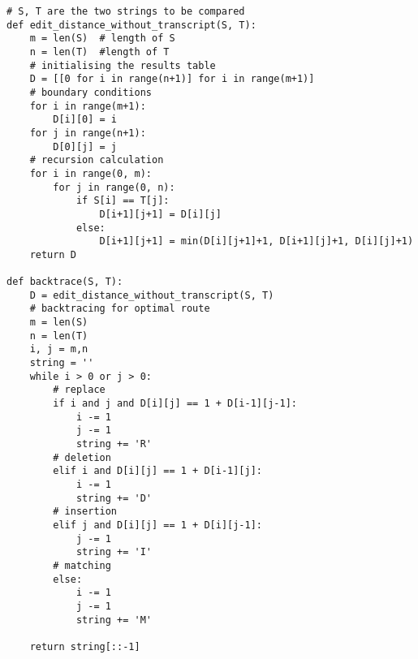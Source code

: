 \lstset{basicstyle=\footnotesize,style=myCustomMatlabStyle}
\begin{lstlisting}
# S, T are the two strings to be compared
def edit_distance_without_transcript(S, T):
    m = len(S)  # length of S
    n = len(T)  #length of T
    # initialising the results table
    D = [[0 for i in range(n+1)] for i in range(m+1)]
    # boundary conditions
    for i in range(m+1):
        D[i][0] = i
    for j in range(n+1):
        D[0][j] = j
    # recursion calculation
    for i in range(0, m):
        for j in range(0, n):
            if S[i] == T[j]:
                D[i+1][j+1] = D[i][j]
            else:
                D[i+1][j+1] = min(D[i][j+1]+1, D[i+1][j]+1, D[i][j]+1)
    return D

def backtrace(S, T):
    D = edit_distance_without_transcript(S, T)
    # backtracing for optimal route
    m = len(S)
    n = len(T)
    i, j = m,n
    string = ''
    while i > 0 or j > 0:
        # replace
        if i and j and D[i][j] == 1 + D[i-1][j-1]:
            i -= 1
            j -= 1
            string += 'R'
        # deletion
        elif i and D[i][j] == 1 + D[i-1][j]:
            i -= 1
            string += 'D'
        # insertion
        elif j and D[i][j] == 1 + D[i][j-1]:
            j -= 1
            string += 'I'
        # matching
        else:
            i -= 1
            j -= 1
            string += 'M'

    return string[::-1]
    
\end{lstlisting}